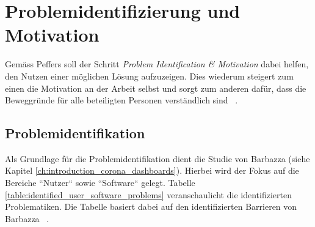 \section{Problemidentifizierung und Motivation}
Gemäss Peffers soll der Schritt \textit{Problem Identification \& Motivation} dabei helfen, den Nutzen einer möglichen Lösung aufzuzeigen. Dies wiederum steigert zum einen die Motivation an der Arbeit selbst und sorgt zum anderen dafür, dass die Beweggründe für alle beteiligten Personen verständlich sind ~\citep[S. 52 + 55]{peffers}.

\subsection{Problemidentifikation}
Als Grundlage für die Problemidentifikation dient die Studie von Barbazza (siehe Kapitel \ref{ch:introduction_corona_dashboards}). Hierbei wird der Fokus auf die Bereiche ``Nutzer`` sowie ``Software`` gelegt. Tabelle \ref{table:identified_user_software_problems} veranschaulicht die identifizierten Problematiken. Die Tabelle basiert dabei auf den identifizierten Barrieren von Barbazza ~\citep[S. 14 + 15]{barbazza}.

\begin{table}[h]
\centering
{}
\caption{Identifizierte Probleme von Barbazza in den Bereichen Nutzer und Software (Eigene Darstellung)}
\label{table:identified_user_software_problems}
\end{table}


